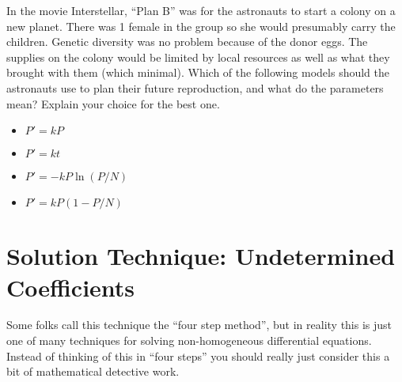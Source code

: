 \begin{problem}
    In the movie Interstellar, ``Plan B'' was for the astronauts to start a colony on a new
    planet.  There was 1 female in the group so she would presumably carry the children.
    Genetic diversity was no problem because of the donor eggs.  The supplies on the colony
    would be limited by local resources as well as what they brought with them
    (which minimal).  Which of the following models should the astronauts use to plan
    their future reproduction, and what do the parameters mean?  Explain your choice for the best one.
    \begin{itemize}
        \item $P' = kP$
        \item $P' = kt$
        \item $P' = -kP\ln(P/N)$
        \item $P' = kP(1-P/N) $
    \end{itemize}
\end{problem}


\section{Solution Technique: Undetermined Coefficients}
Some folks call this technique the ``four step method'', but in reality this is just one
of many techniques for solving non-homogeneous differential equations.  Instead of
thinking of this in ``four steps'' you should really just consider this a bit of
mathematical detective work.  


